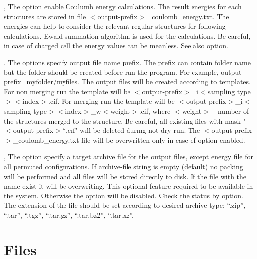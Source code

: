 \documentclass[a4paper,english]{article}
\begin{document}
\begin{Description}
\item[\Opt{-q}, \Opt{\Dd coulomb-energy}] 
      The option enable Coulumb energy calculations. The result energies for each structures are stored in file $<$output-prefix$>$\_coulomb\_energy.txt. The energies can help to consider the relevant regular structures for following calculations. Ewald summation algorithm is used for the calculations. Be careful, in case of charged cell the energy values can be meanless. See also  option.
      
\item[\OptArg{-o }{output-prefix}, \OptArg{\Dd output-prefix=}{output-prefix}]
      The options specify output file name prefix. The prefix can contain folder name but the folder should be created before run the program. For example, \Dd output-prefix=myfolder/myfiles. The output files will be created according to templates. For non merging run the template will be $<$output-prefix$>$\_i$<$sampling type$><$index$>$.cif. For merging run the template will be $<$output-prefix$>$\_i$<$sampling type$><$index$>$\_w$<$weight$>$.cif, where $<$weight$>$ - number of the structures merged to the structure. Be careful, all existing files with mask "$<$output-prefix$>$*.cif" will be deleted during not dry-run. The $<$output-prefix$>$\_coulomb\_energy.txt file will be overwritten only in case of  option enabled.
      
\item[\OptArg{-a }{archive-file}, \OptArg{\Dd archive=}{archive-file}]
      The option specify a target archive file for the output files, except energy file for all permuted configurations. If archive-file string is empty (default) no packing will be performed and all files will be stored directly to disk. If the file with the name exist it will be overwriting. This optional feature required   to be available in the system. Otherwise the option will be disabled. Check the status by  option. The extension of the file should be set according to desired archive type: ``.zip'', ``.tar'', ``.tgz'', ``.tar.gz'', ``.tar.bz2'', ``.tar.xz''.

\end{Description}

\section{Files}

\end{document}

